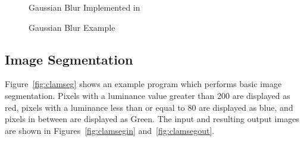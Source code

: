 \begin{figure}[hb!]
  \begin{center}
  
  \caption{Gaussian Blur Implemented in \sys{}}
  \label{fig:clamblur}
  \end{center}
\end{figure}
{
  \captionsetup{justification=centering}
  \begin{figure}[h!]
    \centering
    \hfill
    \hfill
    \captionsetup{font=bf}
    \caption{Gaussian Blur \sys{} Example}
  \end{figure}
}

\clearpage
\subsection{Image Segmentation}
Figure~\ref{fig:clamseg} shows an example \sys{} program which performs
basic image segmentation. Pixels with a luminance value greater than 200 are
displayed as red, pixels with a luminance less than or equal to 80 are displayed as blue,
and pixels in between are displayed as Green. The input and resulting output images are shown in
Figures~\ref{fig:clamsegin} and~\ref{fig:clamsegout}.

